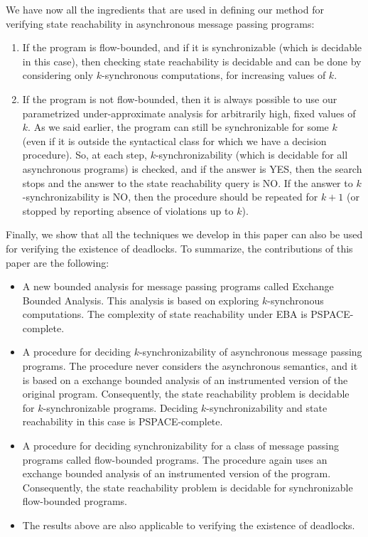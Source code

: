 We have now all the ingredients that are used in defining our method for verifying state reachability in asynchronous message passing programs: 
\begin{enumerate}
\item
If the program is flow-bounded, and if it is synchronizable (which is decidable in this case), then checking state reachability is decidable and can be done by considering only $k$-synchronous computations, for increasing values of $k$. 
\item 
If the program is not flow-bounded, then it is always possible to use our parametrized under-approximate analysis for arbitrarily high, fixed values of $k$. As we said earlier, the program can still be synchronizable for some $k$ (even if it is outside the syntactical class for which we have a decision procedure). So, at each step, $k$-synchronizability (which is decidable for all asynchronous programs) is checked, and if the answer is YES, then the search stops and the answer to the state reachability query is NO. If the answer to $k$-synchronizability is NO, then the procedure should be repeated for $k+1$ (or stopped by reporting absence of violations up to $k$).  
\end{enumerate}

Finally, we show that all the techniques we develop in this paper can also be used for verifying the existence of deadlocks. To summarize, the contributions of this paper are the following:

\begin{itemize}
\item A new bounded analysis for message passing programs called Exchange Bounded Analysis. This analysis is based on exploring $k$-synchronous computations. The complexity of state reachability under EBA is PSPACE-complete. 

\item A procedure for deciding $k$-synchronizability of asynchronous message passing programs. The procedure never considers the asynchronous semantics, and it is based on a exchange bounded analysis of an instrumented version of the original program. Consequently, the state reachability problem is decidable for $k$-synchronizable programs. Deciding  $k$-synchronizability and state reachability in this case is PSPACE-complete. 

\item A procedure for deciding synchronizability for a class of message passing programs called flow-bounded programs. The procedure again uses an exchange bounded analysis of an instrumented version of the program. Consequently, the state reachability problem is decidable for synchronizable flow-bounded programs. 

\item The results above are also applicable to verifying the existence of deadlocks. 

\end{itemize}
